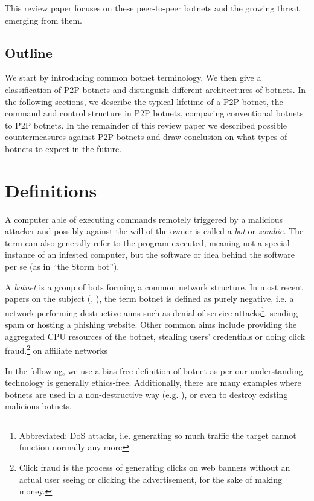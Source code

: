 \documentclass{llncs}
\begin{document}
This review paper focuses on these peer-to-peer botnets and the
growing threat emerging from them. 

\subsection*{Outline}
We start by introducing common botnet terminology. We then give a
classification of P2P botnets and distinguish different architectures
of botnets. In the following sections, we describe the typical
lifetime of a P2P botnet, the command and control structure in P2P
botnets, comparing conventional botnets to P2P botnets. In the
remainder of this review paper we described possible countermeasures
against P2P botnets and draw conclusion on what types of botnets to
expect in the future.


\section{Definitions}
A computer able of executing commands remotely triggered by a
malicious attacker and possibly against the will of the owner is
called a {\it bot} or {\it zombie.} The term can also generally refer
to the program executed, meaning not a special instance of an infested
computer, but the software or idea behind the software per se (as in
``the Storm bot'').

A {\it botnet} is a group of bots forming a common network
structure.\cite{schoof2007detecting} In most recent papers on the
subject (\cite{wang2009systematic}, \cite{abu2006multifaceted}), the
term botnet is defined as purely negative, i.e. a network performing
destructive aims such as denial-of-service
attacks\footnote{Abbreviated: DoS attacks, i.e. generating so much
  traffic the target cannot function normally any more}, sending spam
or hosting a phishing website\cite{steggink2007detection}. Other
common aims include providing the aggregated CPU resources of the
botnet, stealing users' credentials \cite{borgaonkar2010analysis} or
doing click fraud.\footnote{Click fraud is the process of generating
  clicks on web banners without an actual user seeing or clicking the
  advertisement, for the sake of making money.} on affiliate
networks\cite{clickFraud}

In the following, we use a bias-free definition of botnet as per
our understanding technology is generally ethics-free. Additionally,
there are many examples where botnets are used in a non-destructive
way (e.g. \cite{seti}), or even to destroy existing malicious botnets.
\end{document}
